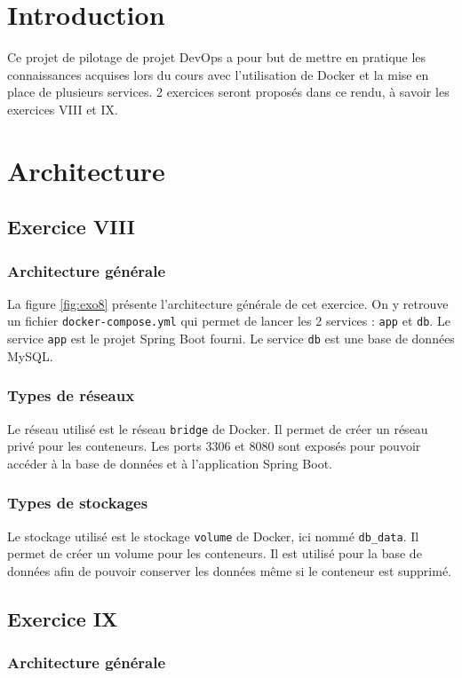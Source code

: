 \section{Introduction}
Ce projet de pilotage de projet DevOps a pour but de mettre en pratique les connaissances acquises lors du cours avec l'utilisation de Docker et la mise en place de plusieurs services. 2 exercices seront proposés dans ce rendu, à savoir les exercices VIII et IX.

\section{Architecture}
\subsection{Exercice VIII}
\subsubsection*{Architecture générale}
La figure \ref{fig:exo8} présente l'architecture générale de cet exercice. On y retrouve un fichier \verb|docker-compose.yml| qui permet de lancer les 2 services : \verb|app| et \verb|db|. Le service \verb|app| est le projet Spring Boot fourni. Le service \verb|db| est une base de données MySQL.

\subsubsection*{Types de réseaux}
Le réseau utilisé est le réseau \verb|bridge| de Docker. Il permet de créer un réseau privé pour les conteneurs. Les ports 3306 et 8080 sont exposés pour pouvoir accéder à la base de données et à l'application Spring Boot.
\subsubsection*{Types de stockages}
Le stockage utilisé est le stockage \verb|volume| de Docker, ici nommé \verb|db_data|. Il permet de créer un volume pour les conteneurs. Il est utilisé pour la base de données afin de pouvoir conserver les données même si le conteneur est supprimé.

\subsection{Exercice IX}
\subsubsection*{Architecture générale}
